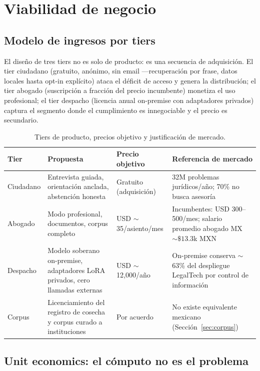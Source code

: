 \section{Viabilidad de negocio}\label{sec:viabilidad}

\subsection{Modelo de ingresos por tiers}

El diseño de tres tiers no es solo de producto: es una secuencia de adquisición. El tier ciudadano (gratuito, anónimo, sin email ---recuperación por frase, datos locales hasta opt-in explícito) ataca el déficit de acceso y genera la distribución; el tier abogado (suscripción a fracción del precio incumbente) monetiza el uso profesional; el tier despacho (licencia anual on-premise con adaptadores privados) captura el segmento donde el cumplimiento es innegociable y el precio es secundario.

\begin{table}[H]
\centering\small
\caption{Tiers de producto, precios objetivo y justificación de mercado.}
\label{tab:tiers}
\begin{tabular}{@{}p{2.2cm}p{4.6cm}p{3.4cm}p{3.8cm}@{}}
\toprule
\textbf{Tier} & \textbf{Propuesta} & \textbf{Precio objetivo} & \textbf{Referencia de mercado} \\
\midrule
Ciudadano & Entrevista guiada, orientación anclada, abstención honesta & Gratuito (adquisición) & 32M problemas jurídicos/año; 70\% no busca asesoría\cite{wjpmx2019} \\
Abogado & Modo profesional, documentos, corpus completo & USD $\sim$35/asiento/mes & Incumbentes: USD 300--500/mes\cite{vaquill2026}; salario promedio abogado MX $\sim\$13.3$k MXN\cite{forojuridico2023} \\
Despacho & Modelo soberano on-premise, adaptadores LoRA privados, cero llamadas externas & USD $\sim$12,000/año & On-premise conserva $\sim$63\% del despliegue LegalTech por control de información\cite{fortune2026} \\
Corpus & Licenciamiento del registro de cosecha y corpus curado a instituciones & Por acuerdo & No existe equivalente mexicano (Sección~\ref{sec:corpus}) \\
\bottomrule
\end{tabular}
\end{table}

\subsection{Unit economics: el cómputo no es el problema}


